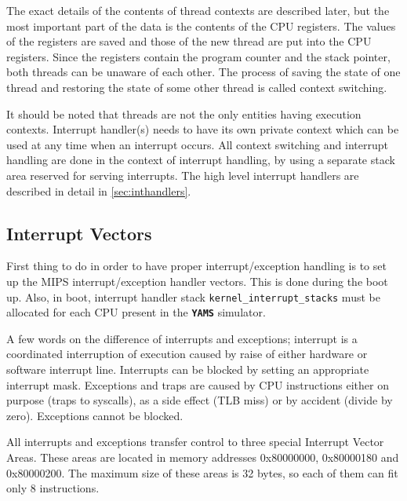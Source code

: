 \documentclass[twoside,a4paper]{report}
\newcommand{\yams}{\texttt{\textbf{YAMS}}}
\begin{document}
The exact details of the contents of thread contexts are described
later, but the most important part of the data is the contents of the
CPU registers. The values of the registers are saved and those of the
new thread are put into the CPU registers. Since the registers contain
the program counter and the stack pointer, both threads can be unaware of
each other. The process of saving the state of one thread and
restoring the state of some other thread is called context switching.

It should be noted that threads are not the only entities having
execution contexts. Interrupt handler(s) needs to have its own private
context which can be used at any time when an interrupt occurs. All
context switching and interrupt handling are done in the context of
interrupt handling, by using a separate stack area reserved for
serving interrupts. The high level interrupt handlers are described in
detail in \autoref{sec:inthandlers}.

\subsection{Interrupt Vectors}

First thing to do in order to have proper interrupt/exception handling
is to set up the MIPS interrupt/exception handler vectors. This is
done during the boot up. Also, in boot, interrupt handler stack
\texttt{kernel\_interrupt\_stacks} must be allocated for each CPU
present in the \yams{} simulator.

A few words on the difference of interrupts and exceptions; interrupt
is a coordinated interruption of execution caused by raise of either
hardware or software interrupt line. Interrupts can be blocked by
setting an appropriate interrupt mask. Exceptions and traps are caused by
CPU instructions either on purpose (traps to syscalls), as a side
effect (TLB miss) or by accident (divide by zero). Exceptions cannot
be blocked.

All interrupts and exceptions transfer control to three special
Interrupt Vector Areas. These areas are located in memory addresses
0x80000000, 0x80000180 and 0x80000200. The maximum size of these areas is
32 bytes, so each of them can fit only 8 instructions.
\end{document}
